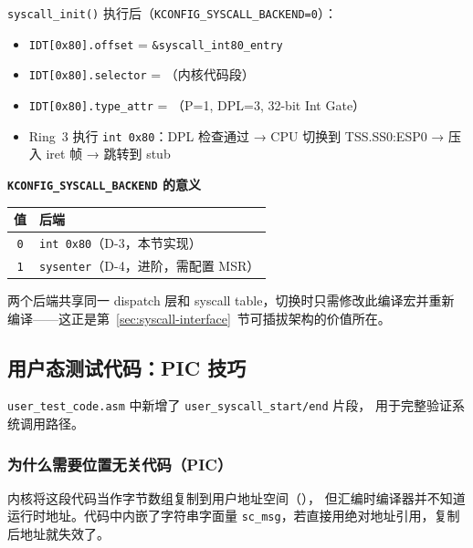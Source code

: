 \begin{cpustate}
\texttt{syscall\_init()} 执行后（\texttt{KCONFIG\_SYSCALL\_BACKEND=0}）：
\begin{itemize}
  \item \texttt{IDT[0x80].offset} = \texttt{\&syscall\_int80\_entry}
  \item \texttt{IDT[0x80].selector} = （内核代码段）
  \item \texttt{IDT[0x80].type\_attr} = （P=1, DPL=3, 32-bit Int Gate）
  \item Ring~3 执行 \texttt{int 0x80}：DPL 检查通过 →
    CPU 切换到 TSS.SS0:ESP0 → 压入 iret 帧 → 跳转到 stub
\end{itemize}
\end{cpustate}

\begin{designbox}
\textbf{\texttt{KCONFIG\_SYSCALL\_BACKEND} 的意义}

\begin{center}
\begin{tabular}{cl}
  \toprule
  值 & 后端 \\
  \midrule
  \texttt{0} & \texttt{int 0x80}（D-3，本节实现） \\
  \texttt{1} & \texttt{sysenter}（D-4，进阶，需配置 MSR） \\
  \bottomrule
\end{tabular}
\end{center}

两个后端共享同一 dispatch 层和 syscall table，切换时只需修改此编译宏并重新
编译——这正是第~\ref{sec:syscall-interface}~节可插拔架构的价值所在。
\end{designbox}

\subsection{用户态测试代码：PIC 技巧}
\label{sec:int80-user-code}

\texttt{user\_test\_code.asm} 中新增了 \texttt{user\_syscall\_start/end} 片段，
用于完整验证系统调用路径。

\subsubsection{为什么需要位置无关代码（PIC）}

内核将这段代码当作字节数组复制到用户地址空间（），
但汇编时编译器并不知道运行时地址。代码中内嵌了字符串字面量
\texttt{sc\_msg}，若直接用绝对地址引用，复制后地址就失效了。

